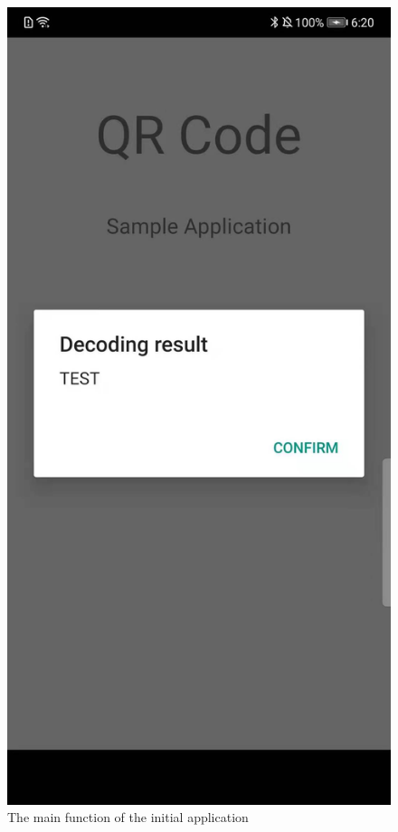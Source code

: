 \documentclass[12pt, a4paper]{article}
\theoremstyle{definition}
\begin{document}
\begin{figure}[htbp]
\begin{minipage}[t]{0.25\linewidth}
		\end{minipage}
		\begin{minipage}[t]{0.25\linewidth}
		\centering
		\includegraphics[width=\linewidth]{5-5.jpeg}
		\end{minipage}
	\caption{The main function of the initial application}\label{fig5}
\end{figure}
\end{document}
